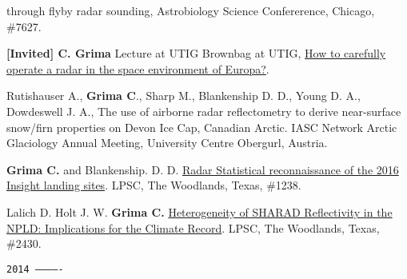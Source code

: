 \begin{etaremune}
{  through flyby radar sounding}, Astrobiology Science Confererence,
  Chicago, \#7627.
\item
  \textbf{{[}Invited{]} C. Grima} Lecture at UTIG Brownbag at UTIG,
  \href{http://www-udc.ig.utexas.edu/external/seminars/seminars/brownbag.htm}{How
  to carefully operate a radar in the space environment of Europa?}.
\item
  Rutishauser A., \textbf{Grima C}., Sharp M., Blankenship D. D., Young
  D. A., Dowdeswell J. A., The use of airborne radar reflectometry to
  derive near-surface snow/firn properties on Devon Ice Cap, Canadian
  Arctic. IASC Network Arctic Glaciology Annual Meeting, University
  Centre Obergurl, Austria.
\item
  \textbf{Grima C.} and Blankenship. D. D.
  \href{http://www.hou.usra.edu/meetings/lpsc2015/pdf/1238.pdf}{Radar
  Statistical reconnaissance of the 2016 Insight landing sites}. LPSC,
  The Woodlands, Texas, \#1238.
\item
  Lalich D. Holt J. W. \textbf{Grima C.}
  \href{http://www.hou.usra.edu/meetings/lpsc2015/pdf/2430.pdf}{Heterogeneity
  of SHARAD Reflectivity in the NPLD: Implications for the Climate
  Record}. LPSC, The Woodlands, Texas, \#2430.

\hspace{-2em}\texttt{2014 -------------}


\end{etaremune}
